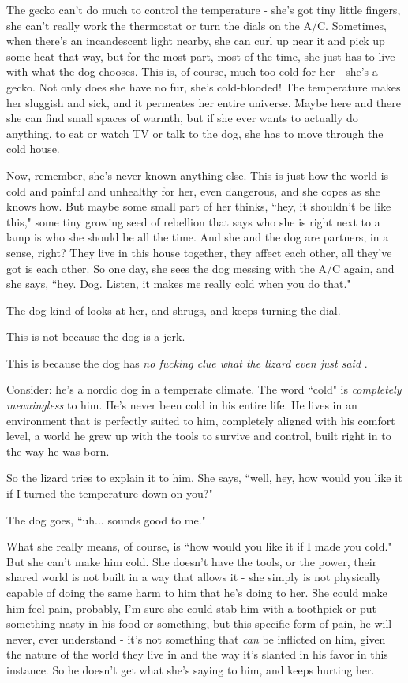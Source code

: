 \documentclass[11pt]{article}
\begin{document}
The gecko can't do much to control the temperature - she's got tiny little fingers, she can't really work the thermostat or turn the dials on the A/C. Sometimes, when there's an incandescent light nearby, she can curl up near it and pick up some heat that way, but for the most part, most of the time, she just has to live with what the dog chooses. This is, of course, much too cold for her - she's a gecko. Not only does she have no fur, she's cold-blooded! The temperature makes her sluggish and sick, and it permeates her entire universe. Maybe here and there she can find small spaces of warmth, but if she ever wants to actually do anything, to eat or watch TV or talk to the dog, she has to move through the cold house.

Now, remember, she's never known anything else. This is just how the world is - cold and painful and unhealthy for her, even dangerous, and she copes as she knows how. But maybe some small part of her thinks, ``hey, it shouldn't be like this," some tiny growing seed of rebellion that says who she is right next to a lamp is who she should be all the time. And she and the dog are partners, in a sense, right? They live in this house together, they affect each other, all they've got is each other. So one day, she sees the dog messing with the A/C again, and she says, ``hey. Dog. Listen, it makes me really cold when you do that."

The dog kind of looks at her, and shrugs, and keeps turning the dial.

This is not because the dog is a jerk.

This is because the dog has {\it no fucking clue what the lizard even just said} .

Consider: he's a nordic dog in a temperate climate. The word ``cold" is {\it completely meaningless}  to him. He's never been cold in his entire life. He lives in an environment that is perfectly suited to him, completely aligned with his comfort level, a world he grew up with the tools to survive and control, built right in to the way he was born.

So the lizard tries to explain it to him. She says, ``well, hey, how would you like it if I turned the temperature down on you?"

The dog goes, ``uh... sounds good to me."

What she really means, of course, is ``how would you like it if I made you cold." But she can't make him cold. She doesn't have the tools, or the power, their shared world is not built in a way that allows it - she simply is not physically capable of doing the same harm to him that he's doing to her. She could make him feel pain, probably, I'm sure she could stab him with a toothpick or put something nasty in his food or something, but this specific form of pain, he will never, ever understand - it's not something that {\it can}  be inflicted on him, given the nature of the world they live in and the way it's slanted in his favor in this instance. So he doesn't get what she's saying to him, and keeps hurting her.
\end{document}
